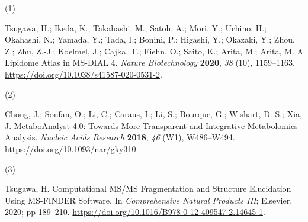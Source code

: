 \documentclass[
]{article}
\newlength{\cslhangindent}
\newlength{\csllabelwidth}
\newlength{\cslentryspacingunit} %
\newenvironment{CSLReferences}[2] %
 {%
  \setlength{\parindent}{0pt}
  \ifodd #1
  \let\oldpar\par
  \def\par{\hangindent=\cslhangindent\oldpar}
  \fi
  \setlength{\parskip}{#2\cslentryspacingunit}
 }%
 {}
\newcommand{\CSLLeftMargin}[1]{\parbox[t]{\csllabelwidth}{#1}}
\newcommand{\CSLRightInline}[1]{\parbox[t]{\linewidth - \csllabelwidth}{#1}\break}
\begin{document}
\hypertarget{refs}{}
\begin{CSLReferences}{0}{0}
\leavevmode{}%
\CSLLeftMargin{(1) }%
\CSLRightInline{Tsugawa, H.; Ikeda, K.; Takahashi, M.; Satoh, A.; Mori,
Y.; Uchino, H.; Okahashi, N.; Yamada, Y.; Tada, I.; Bonini, P.; Higashi,
Y.; Okazaki, Y.; Zhou, Z.; Zhu, Z.-J.; Koelmel, J.; Cajka, T.; Fiehn,
O.; Saito, K.; Arita, M.; Arita, M. A Lipidome Atlas in {MS-DIAL} 4.
\emph{Nature Biotechnology} \textbf{2020}, \emph{38} (10), 1159--1163.
\url{https://doi.org/10.1038/s41587-020-0531-2}.}

\leavevmode{}%
\CSLLeftMargin{(2) }%
\CSLRightInline{Chong, J.; Soufan, O.; Li, C.; Caraus, I.; Li, S.;
Bourque, G.; Wishart, D. S.; Xia, J. {MetaboAnalyst} 4.0: Towards More
Transparent and Integrative Metabolomics Analysis. \emph{Nucleic Acids
Research} \textbf{2018}, \emph{46} (W1), W486--W494.
\url{https://doi.org/10.1093/nar/gky310}.}

\leavevmode{}%
\CSLLeftMargin{(3) }%
\CSLRightInline{Tsugawa, H. Computational {MS}/{MS Fragmentation} and
{Structure Elucidation Using MS-FINDER Software}. In \emph{Comprehensive
{Natural Products III}}; {Elsevier}, 2020; pp 189--210.
\url{https://doi.org/10.1016/B978-0-12-409547-2.14645-1}.}


\end{CSLReferences}
\end{document}
